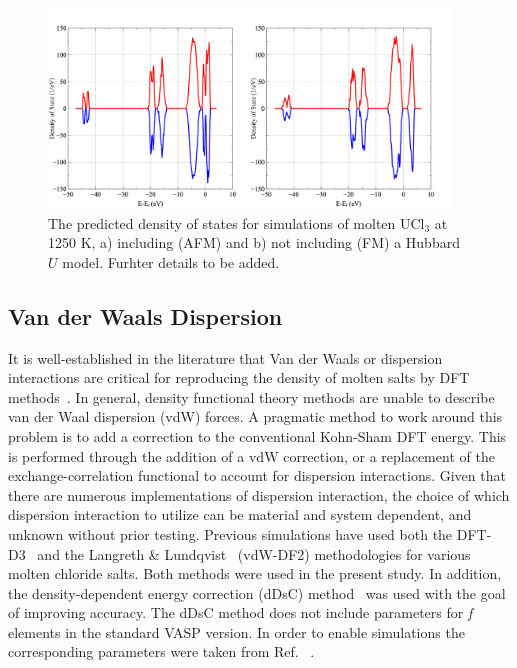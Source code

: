 \documentclass[preprint,3p,10pt,onecolumn,number,sort&compress]{elsarticle}
\begin{document}
\begin{figure}[h]
\centering
\includegraphics[width=0.95\textwidth]{fig2.jpg}
\caption{The predicted density of states for simulations of molten UCl$_3$ at 1250 K, a) including (AFM) and b) not including (FM) a Hubbard $U$ model. {\color{red} Furhter details to be added.}} 
\label{fig:DOS}
\end{figure}


\subsection{Van der Waals Dispersion}

It is well-established in the literature that Van der Waals or dispersion interactions are critical for reproducing the density of molten salts by DFT methods~\cite{Li,Nam2014,Nam2015}. In general, density functional theory methods are unable to describe van der Waal dispersion (vdW) forces. A pragmatic method to work around this problem is to add a correction to the conventional Kohn-Sham DFT energy. This is performed through the addition of a vdW correction, or a replacement of the exchange-correlation functional to account for dispersion interactions. Given that there are numerous implementations of dispersion interaction, the choice of which dispersion interaction to utilize can be material and system dependent, and unknown without prior testing. Previous simulations have used both the DFT-D3~\cite{Li,Grimme} and the Langreth \& Lundqvist~\cite{Nam2015,Dion,Klimes} (vdW-DF2) methodologies for various molten chloride salts. Both methods were used in the present study. In addition, the density-dependent energy correction (dDsC) method~\cite{Steinmann2011,Steinmann2} was used with the goal of improving accuracy. The dDsC method does not include parameters for \textit{f} elements in the standard VASP version. In order to enable simulations the corresponding parameters were taken from Ref. ~\cite{Kim}. 
\end{document}
